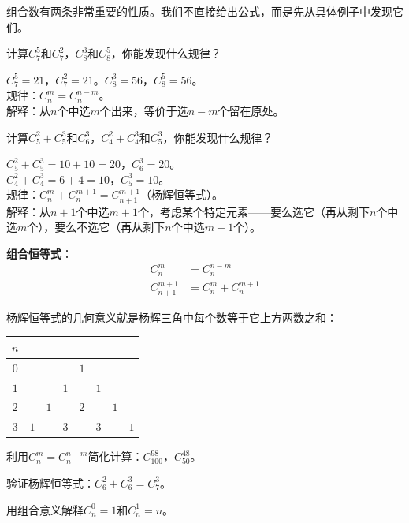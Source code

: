 
组合数有两条非常重要的性质。我们不直接给出公式，而是先从具体例子中发现它们。

\begin{example}
计算$C_7^5$和$C_7^2$，$C_8^3$和$C_8^5$，你能发现什么规律？
\end{example}
\begin{solution}
$C_7^5 = 21$，$C_7^2 = 21$。$C_8^3 = 56$，$C_8^5 = 56$。\\
规律：$C_n^m = C_n^{n-m}$。\\
解释：从$n$个中选$m$个出来，等价于选$n-m$个留在原处。
\end{solution}

\begin{example}
计算$C_5^2 + C_5^3$和$C_6^3$，$C_4^2 + C_4^3$和$C_5^3$，你能发现什么规律？
\end{example}
\begin{solution}
$C_5^2 + C_5^3 = 10 + 10 = 20$，$C_6^3 = 20$。\\
$C_4^2 + C_4^3 = 6 + 4 = 10$，$C_5^3 = 10$。\\
规律：$C_n^m + C_n^{m+1} = C_{n+1}^{m+1}$（杨辉恒等式）。\\
解释：从$n+1$个中选$m+1$个，考虑某个特定元素——要么选它（再从剩下$n$个中选$m$个），要么不选它（再从剩下$n$个中选$m+1$个）。
\end{solution}

\textbf{组合恒等式}：
\begin{align}
C_n^m &= C_n^{n-m} \tag{对称性}\\
C_{n+1}^{m+1} &= C_n^m + C_n^{m+1} \tag{杨辉恒等式}
\end{align}

杨辉恒等式的几何意义就是杨辉三角中每个数等于它上方两数之和：
\begin{center}
\begin{tabular}{c|cccccc}
$n$ & & & & & & \\ \hline
$0$ & & & & $1$ & & \\
$1$ & & & $1$ & & $1$ & \\
$2$ & & $1$ & & $2$ & & $1$ \\
$3$ & $1$ & & $3$ & & $3$ & & $1$
\end{tabular}
\end{center}

\begin{exercise}
\item 利用$C_n^m = C_n^{n-m}$简化计算：$C_{100}^{98}$，$C_{50}^{48}$。
\item 验证杨辉恒等式：$C_6^2 + C_6^3 = C_7^3$。
\item 用组合意义解释$C_n^0 = 1$和$C_n^1 = n$。
\end{exercise}

